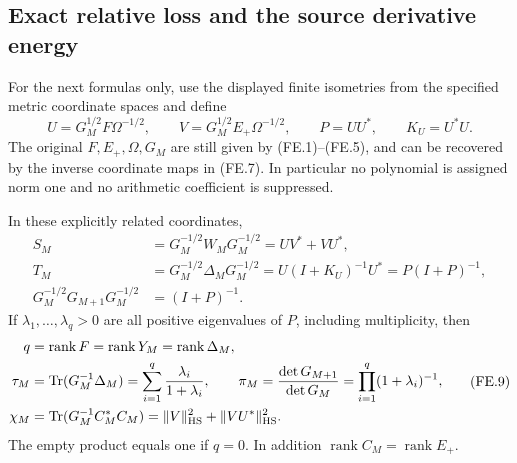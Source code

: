 \subsection{Exact relative loss and the source derivative energy}

For the next formulas only, use the displayed finite isometries
from the specified metric coordinate spaces and define
\[
 U=G_M^{1/2}F\Omega^{-1/2},\qquad
 V=G_M^{1/2}E_+\Omega^{-1/2},\qquad
 P=UU^*,\qquad K_U=U^*U.
 \tag{FE.7}
\]
The original \(F,E_+,\Omega,G_M\) are still given by
(FE.1)--(FE.5), and can be recovered by the inverse coordinate
maps in (FE.7).  In particular no polynomial is assigned norm one
and no arithmetic coefficient is suppressed.

\begin{theorem}
In these explicitly related coordinates,
\[
 \begin{split}
 S_M&=G_M^{-1/2}W_MG_M^{-1/2}=UV^*+VU^*,\\
 T_M&=G_M^{-1/2}\Delta_MG_M^{-1/2}
       =U(I+K_U)^{-1}U^*=P(I+P)^{-1},\\
 G_M^{-1/2}G_{M+1}G_M^{-1/2}&=(I+P)^{-1}.
 \end{split}                                                   \tag{FE.8}
\]
If \(\lambda_1,\ldots,\lambda_q>0\) are all positive
eigenvalues of \(P\), including multiplicity, then
\[
 \begin{split}
 q&=\operatorname{rank}F=\operatorname{rank}Y_M
                       =\operatorname{rank}\Delta_M,\\
 \tau_M&=\operatorname{Tr}(G_M^{-1}\Delta_M)
                =\sum_{i=1}^q\frac{\lambda_i}{1+\lambda_i},\qquad
 \pi_M=\frac{\det G_{M+1}}{\det G_M}
                =\prod_{i=1}^q(1+\lambda_i)^{-1},\\
 \chi_M&=\operatorname{Tr}(G_M^{-1}C_M^*C_M)
                =\|V\|_{\rm HS}^2+\|VU^*\|_{\rm HS}^2.
 \end{split}                                                   \tag{FE.9}
\]
The empty product equals one if \(q=0\).  In addition
\(\operatorname{rank}C_M=\operatorname{rank}E_+\).
\end{theorem}
